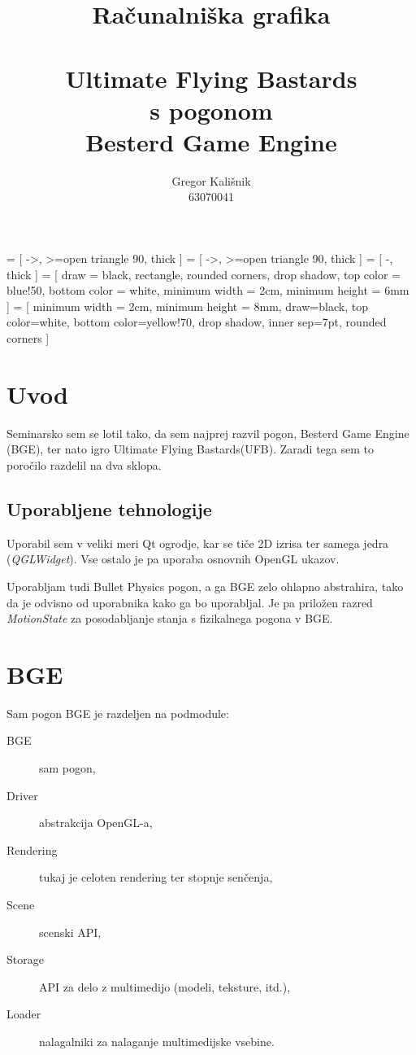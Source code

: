 \documentclass[a4paper]{article}
\author{Gregor Kališnik\\63070041}
\title{Računalniška grafika\\\ \\Ultimate Flying Bastards\\s pogonom\\Besterd Game Engine}
\begin{document}
 = [
  ->,
  >=open triangle 90,
  thick
]
 = [
  ->,
  >=open triangle 90,
  thick
]
 = [
  -,
  thick
]
 = [
  draw = black,
  rectangle,
  rounded corners,
  drop shadow,
  top color = blue!50,
  bottom color = white,
  minimum width = 2cm,
  minimum height = 6mm
]
 = [
  minimum width = 2cm,
  minimum height = 8mm,
  draw=black,
  top color=white,
  bottom color=yellow!70,
  drop shadow,
  inner sep=7pt,
  rounded corners
]

\maketitle
\pagebreak
\tableofcontents
\pagebreak
\listoffigures
\pagebreak

\section{Uvod}
Seminarsko sem se lotil tako, da sem najprej razvil pogon, Besterd Game Engine (BGE), ter nato igro Ultimate Flying Bastards(UFB). Zaradi tega sem to poročilo razdelil na dva sklopa.

\subsection{Uporabljene tehnologije}
Uporabil sem v veliki meri Qt ogrodje, kar se tiče 2D izrisa ter samega jedra (\emph{QGLWidget}). Vse ostalo je pa uporaba osnovnih OpenGL ukazov.

Uporabljam tudi Bullet Physics pogon, a ga BGE zelo ohlapno abstrahira, tako da je odvisno od uporabnika kako ga bo uporabljal. Je pa priložen razred \emph{MotionState} za posodabljanje stanja s fizikalnega pogona v BGE.

\section{BGE}
Sam pogon BGE je razdeljen na podmodule:
\begin{description}
  \item[BGE] sam pogon,
  \item[Driver] abstrakcija OpenGL-a,
  \item[Rendering] tukaj je celoten rendering ter stopnje senčenja,
  \item[Scene] scenski API,
  \item[Storage] API za delo z multimedijo (modeli, teksture, itd.),
  \item[Loader] nalagalniki za nalaganje multimedijske vsebine.
\end{description}
\end{document}
